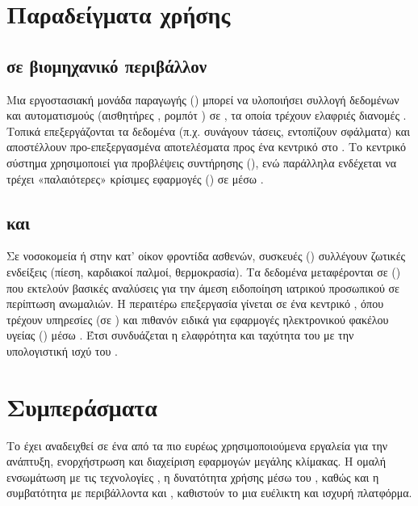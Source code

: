 \section{Παραδείγματα χρήσης}

\subsection{ σε βιομηχανικό περιβάλλον }

Μια εργοστασιακή μονάδα παραγωγής () μπορεί να υλοποιήσει συλλογή δεδομένων και αυτοματισμούς (αισθητήρες , ρομπότ ) σε , τα οποία τρέχουν ελαφριές διανομές . Τοπικά  επεξεργάζονται τα δεδομένα (π.χ. συνάγουν τάσεις, εντοπίζουν σφάλματα) και αποστέλλουν προ-επεξεργασμένα αποτελέσματα προς ένα κεντρικό   στο . Το κεντρικό σύστημα χρησιμοποιεί  για προβλέψεις συντήρησης (), ενώ παράλληλα ενδέχεται να τρέχει «παλαιότερες» κρίσιμες εφαρμογές () σε  μέσω .

\subsection{ και }

Σε νοσοκομεία ή στην κατ’ οίκον φροντίδα ασθενών,  συσκευές () συλλέγουν ζωτικές ενδείξεις (πίεση, καρδιακοί παλμοί, θερμοκρασία). Τα δεδομένα μεταφέρονται σε  () που εκτελούν βασικές αναλύσεις για την άμεση ειδοποίηση ιατρικού προσωπικού σε περίπτωση ανωμαλιών. Η περαιτέρω επεξεργασία γίνεται σε ένα κεντρικό  , όπου τρέχουν υπηρεσίες  (σε ) και πιθανόν ειδικά  για εφαρμογές ηλεκτρονικού φακέλου υγείας () μέσω . Έτσι συνδυάζεται η ελαφρότητα και ταχύτητα του  με την υπολογιστική ισχύ του .

\section{Συμπεράσματα}

Το  έχει αναδειχθεί σε ένα από τα πιο ευρέως χρησιμοποιούμενα εργαλεία για την ανάπτυξη, ενορχήστρωση και διαχείριση εφαρμογών μεγάλης κλίμακας. Η ομαλή ενσωμάτωση με τις τεχνολογίες , η δυνατότητα χρήσης  μέσω του , καθώς και η συμβατότητα με περιβάλλοντα  και , καθιστούν το  μια ευέλικτη και ισχυρή πλατφόρμα.

